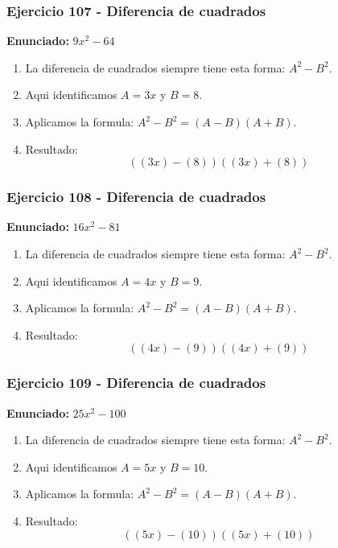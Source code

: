 \documentclass[11pt,a4paper]{article}
\begin{document}
\vspace{0.2cm}
\subsubsection*{Ejercicio 107 - Diferencia de cuadrados}
\textbf{Enunciado:} $ 9 x^{2} - 64 $\par
\begin{enumerate}[leftmargin=2em]
\item La diferencia de cuadrados siempre tiene esta forma: \(A^2-B^2\).
\item Aqui identificamos \(A=3 x\) y \(B=8\).
\item Aplicamos la formula: \(A^2-B^2=(A-B)(A+B)\).
\item Resultado: \[\boxed{\left(\left(3 x\right)-\left(8\right)\right)\left(\left(3 x\right)+\left(8\right)\right)}\]
\end{enumerate}

\vspace{0.2cm}
\subsubsection*{Ejercicio 108 - Diferencia de cuadrados}
\textbf{Enunciado:} $ 16 x^{2} - 81 $\par
\begin{enumerate}[leftmargin=2em]
\item La diferencia de cuadrados siempre tiene esta forma: \(A^2-B^2\).
\item Aqui identificamos \(A=4 x\) y \(B=9\).
\item Aplicamos la formula: \(A^2-B^2=(A-B)(A+B)\).
\item Resultado: \[\boxed{\left(\left(4 x\right)-\left(9\right)\right)\left(\left(4 x\right)+\left(9\right)\right)}\]
\end{enumerate}

\vspace{0.2cm}
\subsubsection*{Ejercicio 109 - Diferencia de cuadrados}
\textbf{Enunciado:} $ 25 x^{2} - 100 $\par
\begin{enumerate}[leftmargin=2em]
\item La diferencia de cuadrados siempre tiene esta forma: \(A^2-B^2\).
\item Aqui identificamos \(A=5 x\) y \(B=10\).
\item Aplicamos la formula: \(A^2-B^2=(A-B)(A+B)\).
\item Resultado: \[\boxed{\left(\left(5 x\right)-\left(10\right)\right)\left(\left(5 x\right)+\left(10\right)\right)}\]
\end{enumerate}
\end{document}
